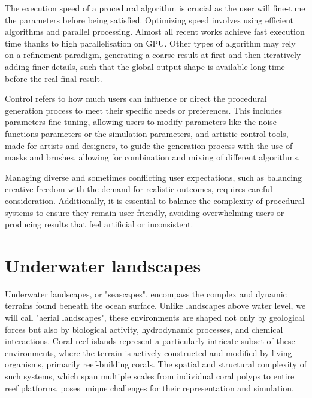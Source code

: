 The execution speed of a procedural algorithm is crucial as the user will fine-tune the parameters before being satisfied.
Optimizing speed involves using efficient algorithms and parallel processing. Almost all recent works achieve fast execution time thanks to high parallelisation on GPU. Other types of algorithm may rely on a refinement paradigm, generating a coarse result at first and then iteratively adding finer details, such that the global output shape is available long time before the real final result.

Control refers to how much users can influence or direct the procedural generation process to meet their specific needs or preferences. This includes parameters fine-tuning, allowing users to modify parameters like the noise functions parameters or the simulation parameters, and artistic control tools, made for artists and designers, to guide the generation process with the use of masks and brushes, allowing for combination and mixing of different algorithms.

Managing diverse and sometimes conflicting user expectations, such as balancing creative freedom with the demand for realistic outcomes, requires careful consideration. Additionally, it is essential to balance the complexity of procedural systems to ensure they remain user-friendly, avoiding overwhelming users or producing results that feel artificial or inconsistent.




\section{Underwater landscapes}
Underwater landscapes, or "seascapes", encompass the complex and dynamic terrains found beneath the ocean surface. Unlike landscapes above water level, we will call "aerial landscapes", these environments are shaped not only by geological forces but also by biological activity, hydrodynamic processes, and chemical interactions. Coral reef islands represent a particularly intricate subset of these environments, where the terrain is actively constructed and modified by living organisms, primarily reef-building corals. The spatial and structural complexity of such systems, which span multiple scales from individual coral polyps to entire reef platforms, poses unique challenges for their representation and simulation.

